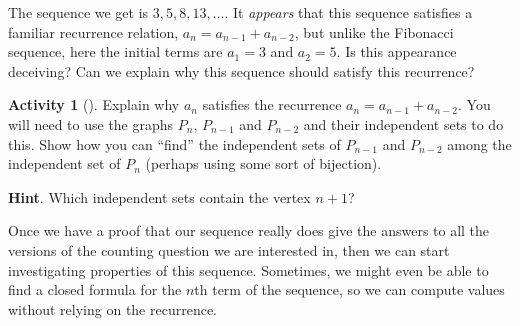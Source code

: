 \documentclass[10pt,]{book}
\theoremstyle{plain}
\theoremstyle{definition}
\theoremstyle{definition}
\theoremstyle{definition}
\newtheorem{activity}[project]{Activity}
\numberwithin{equation}{chapter}
\begin{document}
\par
\hypertarget{p-889}{}%
The sequence we get is \(3, 5, 8, 13, \ldots\).  It \emph{appears} that this sequence satisfies a familiar recurrence relation, \(a_n = a_{n-1} + a_{n-2}\), but unlike the Fibonacci sequence, here the initial terms are \(a_1 = 3\) and \(a_2 = 5\).  Is this appearance deceiving?  Can we explain why this sequence should satisfy this recurrence?%
\begin{activity}[]\label{activity-126}
\hypertarget{p-890}{}%
Explain why \(a_n\) satisfies the recurrence \(a_n = a_{n-1} + a_{n-2}\).  You will need to use the graphs \(P_n\), \(P_{n-1}\) and \(P_{n-2}\) and their independent sets to do this.  Show how you can ``find'' the independent sets of \(P_{n-1}\) and \(P_{n-2}\) among the independent set of \(P_{n}\) (perhaps using some sort of bijection).%
\par\smallskip%
\noindent\textbf{Hint}.\hypertarget{hint-91}{}\quad%
\hypertarget{p-891}{}%
Which independent sets contain the vertex \(n+1\)?%
\end{activity}
\hypertarget{p-892}{}%
Once we have a proof that our sequence really does give the answers to all the versions of the counting question we are interested in, then  we can start investigating properties of this sequence.  Sometimes, we might even be able to find a closed formula for the \(n\)th term of the sequence, so we can compute values without relying on the recurrence.%
\typeout{************************************************}
\typeout{************************************************}
\end{document}
